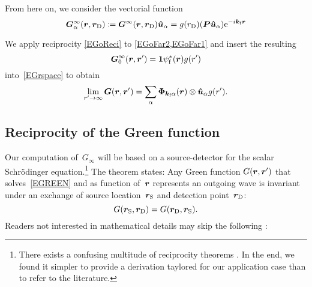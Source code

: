 From here on, we consider the vectorial function
\begin{equation}
  \bm{G}^\infty_\alpha(\bm{r},\bm{r}_\text{D})
  \coloneqq \bm{G}^\infty(\bm{r},\bm{r}_\text{D}) {\bm{\hat u}}_\alpha
  = g(r_\text{D}) (\bm{P}{\bm{\hat u}}_\alpha)  \mathrm e^{-i{\bm{k}}_{\text{f}}\bm{r}}
\end{equation}


We apply reciprocity \cref{EGoReci}
to \cref{EGoFar2,EGoFar1} and insert the resulting
\begin{equation}
  \bm{G}_0^\infty(\bm{r},\bm{r}')=\bm{1}\psi^*_{\text{f}}(\bm{r})g(r')
\end{equation}
into~\cref{EGrspace} to obtain
%
\begin{equation}\label{EGresult}
  \lim_{r'\to\infty}\TG(\r,\r')
  = \sum_\alpha \v\Phi_{\k_\sf\alpha}(\r)\otimes \hu_\alpha g(r').
\end{equation}


\subsection{Reciprocity of the Green function}\label{SReci}

%
%

Our computation of~$G_\infty$ will be based on a source-detector 
for the scalar Schrödinger equation.\footnote
{There exists a confusing multitude of reciprocity theorems \cite{Pot04}.
In the end, we found it simpler to provide a derivation taylored for our application case
than to refer to the literature.}
The theorem states:
Any Green function $G(\bm{r},\bm{r}')$
that solves~\cref{EGREEN} and as function of~$\bm{r}$ represents an outgoing wave
is invariant under an exchange of source location~$\bm{r}_\text{S}$ and detection point~$\bm{r}_\text{D}$:
%
%
\begin{equation}\label{Erecip}
  G(\rS,\rD) = G(\rD,\rS).
\end{equation}
Readers not interested in mathematical details may skip the following :

